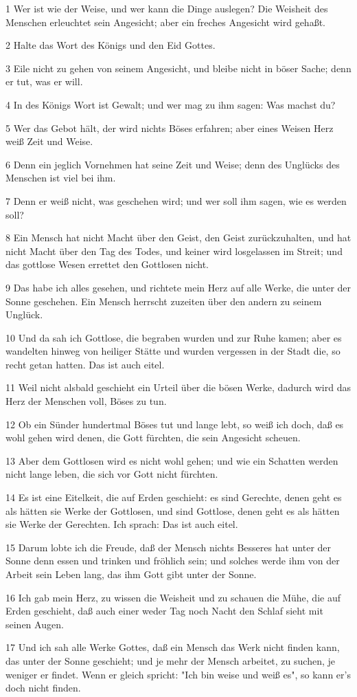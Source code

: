 \par 1 Wer ist wie der Weise, und wer kann die Dinge auslegen? Die Weisheit des Menschen erleuchtet sein Angesicht; aber ein freches Angesicht wird gehaßt.
\par 2 Halte das Wort des Königs und den Eid Gottes.
\par 3 Eile nicht zu gehen von seinem Angesicht, und bleibe nicht in böser Sache; denn er tut, was er will.
\par 4 In des Königs Wort ist Gewalt; und wer mag zu ihm sagen: Was machst du?
\par 5 Wer das Gebot hält, der wird nichts Böses erfahren; aber eines Weisen Herz weiß Zeit und Weise.
\par 6 Denn ein jeglich Vornehmen hat seine Zeit und Weise; denn des Unglücks des Menschen ist viel bei ihm.
\par 7 Denn er weiß nicht, was geschehen wird; und wer soll ihm sagen, wie es werden soll?
\par 8 Ein Mensch hat nicht Macht über den Geist, den Geist zurückzuhalten, und hat nicht Macht über den Tag des Todes, und keiner wird losgelassen im Streit; und das gottlose Wesen errettet den Gottlosen nicht.
\par 9 Das habe ich alles gesehen, und richtete mein Herz auf alle Werke, die unter der Sonne geschehen. Ein Mensch herrscht zuzeiten über den andern zu seinem Unglück.
\par 10 Und da sah ich Gottlose, die begraben wurden und zur Ruhe kamen; aber es wandelten hinweg von heiliger Stätte und wurden vergessen in der Stadt die, so recht getan hatten. Das ist auch eitel.
\par 11 Weil nicht alsbald geschieht ein Urteil über die bösen Werke, dadurch wird das Herz der Menschen voll, Böses zu tun.
\par 12 Ob ein Sünder hundertmal Böses tut und lange lebt, so weiß ich doch, daß es wohl gehen wird denen, die Gott fürchten, die sein Angesicht scheuen.
\par 13 Aber dem Gottlosen wird es nicht wohl gehen; und wie ein Schatten werden nicht lange leben, die sich vor Gott nicht fürchten.
\par 14 Es ist eine Eitelkeit, die auf Erden geschieht: es sind Gerechte, denen geht es als hätten sie Werke der Gottlosen, und sind Gottlose, denen geht es als hätten sie Werke der Gerechten. Ich sprach: Das ist auch eitel.
\par 15 Darum lobte ich die Freude, daß der Mensch nichts Besseres hat unter der Sonne denn essen und trinken und fröhlich sein; und solches werde ihm von der Arbeit sein Leben lang, das ihm Gott gibt unter der Sonne.
\par 16 Ich gab mein Herz, zu wissen die Weisheit und zu schauen die Mühe, die auf Erden geschieht, daß auch einer weder Tag noch Nacht den Schlaf sieht mit seinen Augen.
\par 17 Und ich sah alle Werke Gottes, daß ein Mensch das Werk nicht finden kann, das unter der Sonne geschieht; und je mehr der Mensch arbeitet, zu suchen, je weniger er findet. Wenn er gleich spricht: "Ich bin weise und weiß es", so kann er's doch nicht finden.

